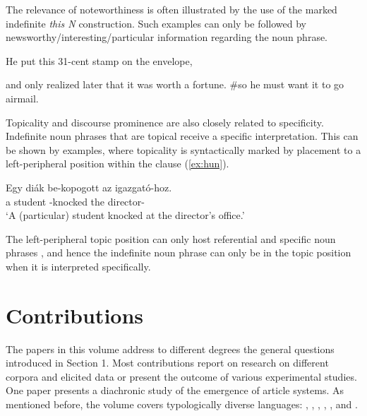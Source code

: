 \documentclass[output=paper]{langsci/langscibook}
\begin{document}
{
The relevance of noteworthiness is often illustrated by the use of the marked indefinite {\emph{this N}} construction. Such examples can only be followed by newsworthy/interesting/particular information regarding the noun phrase. 
}

\begin{exe}
\ex He put this 31-cent stamp on the envelope, \hfill\citep[after][]{maclaran:82}
	\begin{xlista}
	\ex and only realized later that it was worth a fortune.
	\ex \#so he must want it to go airmail.
	\end{xlista}
\end{exe}	

Topicality and discourse prominence are also closely related to specificity. Indefinite noun phrases that are topical receive a specific interpretation. This can be shown by  examples, where topicality is syntactically marked by placement to a left-peripheral position within the clause (\ref{ex:hun}). 

\begin{exe}
\ex\label{ex:hun}
\gll Egy di\'ak be-kopogott az igazgató-hoz. \\
a student {}-knocked the director-{}\\
\glt `A (particular) student knocked at the director's office.'
\end{exe}

The left-peripheral topic position can only host referential and specific noun phrases \citep[e.\,g.,][]{ekiss:02}, and hence the indefinite noun phrase can only be in the topic position when it is interpreted specifically.


\section{Contributions}

The papers in this volume address to different degrees the general questions introduced in Section 1. Most contributions report on research on different corpora and elicited data or present the outcome of various experimental studies. One paper presents a diachronic study of the emergence of article systems. As mentioned before, the volume covers typologically diverse languages: , , , , ,  and .
\end{document}
